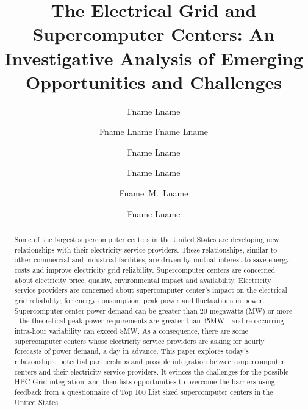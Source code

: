 \documentclass[runningheads]{llncs}
\begin{document}
%
\frontmatter          %
%
\pagestyle{headings}  %
%
%
\mainmatter              %
%
\title{
The Electrical Grid and Supercomputer Centers:  
An Investigative Analysis of Emerging Opportunities and Challenges
}

%
%
%
\author{Fname Lname \and Fname Lname
Fname Lname \and Fname Lname \and Fname Lname \and Fname~M.~Lname \and
Fname Lname}
%
%
%

\maketitle              %

\begin{abstract}
Some of the largest supercomputer centers in the United States are developing new relationships with their electricity service providers. 
These relationships, similar to other commercial and industrial facilities, are driven by mutual interest to save energy costs and improve electricity grid reliability.
Supercomputer centers are concerned about electricity price, quality, environmental impact and availability.
Electricity service providers are concerned about supercomputer center's impact on the electrical grid reliability; for energy consumption, peak power and fluctuations in power.
Supercomputer center power demand can be greater than 20 megawatts (MW) or more - the theoretical peak power requirements are greater than 45MW - and re-occurring intra-hour variability can exceed 8MW.
As a consequence, there are some supercomputer centers whose electricity service providers are asking for hourly forecasts of power demand, a day in advance.
This paper explores today's relationships, potential partnerships and possible integration between supercomputer centers and their electricity service providers.
It evinces the challenges for the possible HPC-Grid integration, and then lists opportunities to overcome the barriers using feedback from a questionnaire of Top 100 List sized supercomputer centers in the United States.
\end{abstract}
\end{document}
